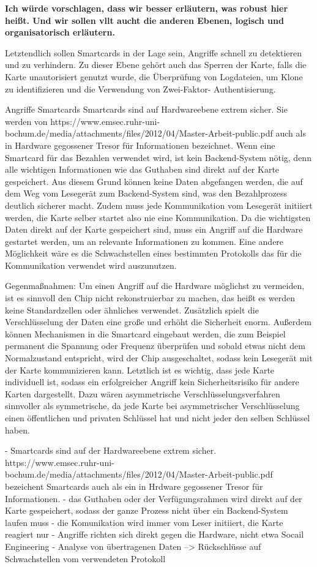 \textbf{Ich würde vorschlagen, dass wir besser erläutern, was robust hier heißt. Und wir sollen vllt
aucht die anderen Ebenen, logisch und organisatorisch erläutern.}


Letztendlich sollen Smartcards in der Lage sein, Angriffe schnell zu detektieren und zu verhindern.
Zu dieser Ebene gehört auch das Sperren der Karte, falls die Karte unautorisiert genutzt wurde, 
die Überprüfung von Logdateien, um Klone zu identifizieren und die Verwendung von Zwei-Faktor-
Authentisierung.


Angriffe Smartcards
Smartcards sind auf Hardwareebene extrem sicher. Sie werden von https://www.emsec.ruhr-uni-bochum.de/media/attachments/files/2012/04/Master-Arbeit-public.pdf
auch als in Hardware gegossener Tresor für Informationen bezeichnet. Wenn eine Smartcard für das Bezahlen verwendet wird,
ist kein Backend-System nötig, denn alle wichtigen Informationen wie das Guthaben sind direkt auf der Karte gespeichert. Aus diesem Grund 
können keine Daten abgefangen werden, die auf dem Weg vom Lesegerät zum Backend-System sind, was den Bezahlprozess deutlich sicherer macht.
Zudem muss jede Kommunikation vom Lesegerät initiiert werden, die Karte selber startet also nie eine Kommunikation. Da die wichtigsten Daten
direkt auf der Karte gespeichert sind, muss ein Angriff auf die Hardware gestartet werden, um an relevante Informationen zu kommen.
Eine andere Möglichkeit wäre es die Schwachstellen eines bestimmten Protokolls das für die Kommunikation verwendet wird auszunutzen.

Gegenmaßnahmen:
Um einen Angriff auf die Hardware möglichst zu vermeiden, ist es sinnvoll den Chip nicht rekonstruierbar zu machen,
das heißt es werden keine Standardzellen oder ähnliches verwendet.
Zusätzlich spielt die Verschlüsselung der Daten eine große und erhöht die Sicherheit enorm.
Außerdem können Mechanismen in die Smartcard eingebaut werden, die zum Beispiel permanent die Spannung oder Frequenz
überprüfen und sobald etwas nicht dem Normalzustand entspricht, wird der Chip ausgeschaltet, sodass kein Lesegerät mit der 
Karte kommunizieren kann. Letztlich ist es wichtig, dass jede Karte individuell ist, sodass ein erfolgreicher Angriff kein 
Sicherheitsrisiko für andere Karten dargestellt. Dazu wären asymmetrische Verschlüsselungsverfahren sinnvoller als 
symmetrische, da jede Karte bei asymmetrischer Verschlüsselung einen öffentlichen und privaten Schlüssel hat und nicht jeder den selben 
Schlüssel haben.




- Smartcards sind auf der Hardwareebene extrem sicher. https://www.emsec.ruhr-uni-bochum.de/media/attachments/files/2012/04/Master-Arbeit-public.pdf bezeichent Smartcards auch als 
  ein in Hrdware gegossener Tresor für Informationen. 
- das Guthaben oder der Verfügungsrahmen wird direkt auf der Karte gespeichert, sodass der ganze Prozess nicht über ein Backend-System laufen muss
- die Komunikation wird immer vom Leser initiiert, die Karte reagiert nur
- Angriffe richten sich direkt gegen die Hardware, nicht etwa Socail Engineering 
- Analyse von übertragenen Daten --> Rückschlüsse auf Schwachstellen vom verwendeten Protokoll

